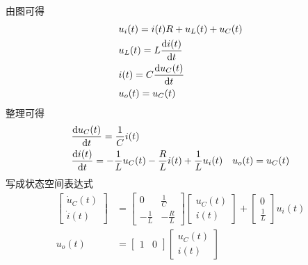 \begin{exercise} %
    由图可得
    \begin{align*}
        &u_i(t) = i(t)R + u_L(t) + u_C(t) \\
        &u_L(t) = L \frac{{\rm{d}}{i(t)}}{{\rm{d}}{t}} \\
        &i(t) = C \frac{{\rm{d}}{u_C(t)}}{{\rm{d}}{t}} \\
        &u_o(t) = u_C(t)
    \end{align*}
    整理可得
    \begin{align*}
        &\frac{{\rm{d}}{u_C(t)}}{{\rm{d}}{t}} = \frac{1}{C} i(t) \\
        &\frac{{\rm{d}}{i(t)}}{{\rm{d}}{t}} = -\frac{1}{L} u_C(t) - \frac{R}{L} i(t) + \frac{1}{L} u_i(t)
        &u_o(t) = u_C(t)
    \end{align*}
    写成状态空间表达式
    \begin{align*}
        \begin{bmatrix}
            \dot{u}_C(t) \\
            \dot{i}(t)
        \end{bmatrix} &= \begin{bmatrix}
            0 & \frac{1}{C} \\
            -\frac{1}{L} & -\frac{R}{L}
        \end{bmatrix} \begin{bmatrix}
            u_C(t) \\
            i(t)
        \end{bmatrix} + \begin{bmatrix}
            0 \\
            \frac{1}{L}
        \end{bmatrix} u_i(t) \\
        u_o(t) &= \begin{bmatrix}
            1 & 0
        \end{bmatrix} \begin{bmatrix}
            u_C(t) \\
            i(t)
        \end{bmatrix}
    \end{align*}
\end{exercise}

